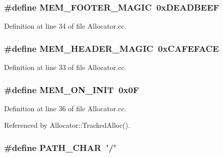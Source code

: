 \subsubsection[{M\-E\-M\-\_\-\-F\-O\-O\-T\-E\-R\-\_\-\-M\-A\-G\-I\-C}]{\setlength{\rightskip}{0pt plus 5cm}\#define M\-E\-M\-\_\-\-F\-O\-O\-T\-E\-R\-\_\-\-M\-A\-G\-I\-C~0x\-D\-E\-A\-D\-B\-E\-E\-F}\label{_allocator_8cc_adb9b241eeb9083c288e77112c7e7b0a5}


Definition at line 34 of file Allocator.\-cc.

\subsubsection[{M\-E\-M\-\_\-\-H\-E\-A\-D\-E\-R\-\_\-\-M\-A\-G\-I\-C}]{\setlength{\rightskip}{0pt plus 5cm}\#define M\-E\-M\-\_\-\-H\-E\-A\-D\-E\-R\-\_\-\-M\-A\-G\-I\-C~0x\-C\-A\-F\-E\-F\-A\-C\-E}\label{_allocator_8cc_a2db6c9af5aa02be13a49f706da54385c}


Definition at line 33 of file Allocator.\-cc.

\subsubsection[{M\-E\-M\-\_\-\-O\-N\-\_\-\-I\-N\-I\-T}]{\setlength{\rightskip}{0pt plus 5cm}\#define M\-E\-M\-\_\-\-O\-N\-\_\-\-I\-N\-I\-T~0x0\-F}\label{_allocator_8cc_ada833569779d8c8a9b8415e8112c1fad}


Definition at line 36 of file Allocator.\-cc.



Referenced by Allocator\-::\-Tracked\-Alloc().

\subsubsection[{P\-A\-T\-H\-\_\-\-C\-H\-A\-R}]{\setlength{\rightskip}{0pt plus 5cm}\#define P\-A\-T\-H\-\_\-\-C\-H\-A\-R~'/'}\label{_allocator_8cc_a83cebbffc784c0755f531e4c19abf8d0}


